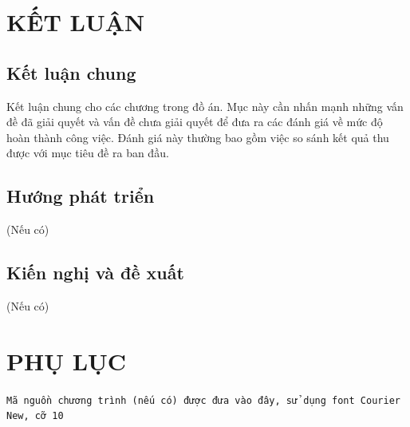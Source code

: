 \documentclass{article} %
\begin{document}
\section*{\centering KẾT LUẬN}
 {}
\subsection*{Kết luận chung}
 {}
Kết luận chung cho các chương trong đồ án. Mục này cần nhấn mạnh những vấn đề đã giải quyết và vấn đề chưa giải quyết để đưa ra các đánh giá về mức độ hoàn thành công việc. Đánh giá này thường bao gồm việc so sánh kết quả thu được với mục tiêu đề ra ban đầu.
\subsection*{Hướng phát triển}
 {}
(Nếu có)
\subsection*{Kiến nghị và đề xuất}
 {}
(Nếu có)
\newpage
 {}


\newpage
\section*{\centering PHỤ LỤC}
 {}
\texttt{\fontsize{10pt}{0pt}\selectfont Mã nguồn chương trình (nếu có) được đưa vào đây,  sử dụng font Courier New, cỡ 10
}
\end{document}

